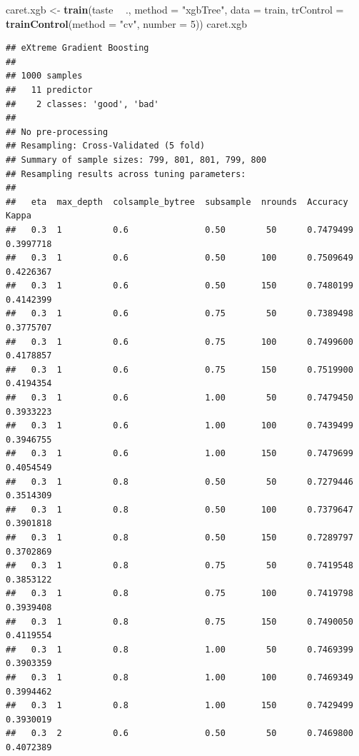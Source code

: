 \documentclass[
]{book}
\newenvironment{Shaded}{\begin{snugshade}}{\end{snugshade}}
\newcommand{\DataTypeTok}[1]{\textcolor[rgb]{0.13,0.29,0.53}{#1}}
\newcommand{\DecValTok}[1]{\textcolor[rgb]{0.00,0.00,0.81}{#1}}
\newcommand{\KeywordTok}[1]{\textcolor[rgb]{0.13,0.29,0.53}{\textbf{#1}}}
\newcommand{\NormalTok}[1]{#1}
\newcommand{\OperatorTok}[1]{\textcolor[rgb]{0.81,0.36,0.00}{\textbf{#1}}}
\newcommand{\StringTok}[1]{\textcolor[rgb]{0.31,0.60,0.02}{#1}}
\theoremstyle{break}
\theoremstyle{definition}
\theoremstyle{definition}
\theoremstyle{definition}
\theoremstyle{remark}
\begin{document}
\begin{Shaded}
\begin{Highlighting}[]
\NormalTok{caret.xgb <-}\StringTok{ }\KeywordTok{train}\NormalTok{(taste }\OperatorTok{~}\StringTok{ }\NormalTok{., }\DataTypeTok{method =} \StringTok{"xgbTree"}\NormalTok{, }\DataTypeTok{data =}\NormalTok{ train,}
                   \DataTypeTok{trControl =} \KeywordTok{trainControl}\NormalTok{(}\DataTypeTok{method =} \StringTok{"cv"}\NormalTok{, }\DataTypeTok{number =} \DecValTok{5}\NormalTok{))}
\NormalTok{caret.xgb}
\end{Highlighting}
\end{Shaded}

\begin{verbatim}
## eXtreme Gradient Boosting 
## 
## 1000 samples
##   11 predictor
##    2 classes: 'good', 'bad' 
## 
## No pre-processing
## Resampling: Cross-Validated (5 fold) 
## Summary of sample sizes: 799, 801, 801, 799, 800 
## Resampling results across tuning parameters:
## 
##   eta  max_depth  colsample_bytree  subsample  nrounds  Accuracy   Kappa    
##   0.3  1          0.6               0.50        50      0.7479499  0.3997718
##   0.3  1          0.6               0.50       100      0.7509649  0.4226367
##   0.3  1          0.6               0.50       150      0.7480199  0.4142399
##   0.3  1          0.6               0.75        50      0.7389498  0.3775707
##   0.3  1          0.6               0.75       100      0.7499600  0.4178857
##   0.3  1          0.6               0.75       150      0.7519900  0.4194354
##   0.3  1          0.6               1.00        50      0.7479450  0.3933223
##   0.3  1          0.6               1.00       100      0.7439499  0.3946755
##   0.3  1          0.6               1.00       150      0.7479699  0.4054549
##   0.3  1          0.8               0.50        50      0.7279446  0.3514309
##   0.3  1          0.8               0.50       100      0.7379647  0.3901818
##   0.3  1          0.8               0.50       150      0.7289797  0.3702869
##   0.3  1          0.8               0.75        50      0.7419548  0.3853122
##   0.3  1          0.8               0.75       100      0.7419798  0.3939408
##   0.3  1          0.8               0.75       150      0.7490050  0.4119554
##   0.3  1          0.8               1.00        50      0.7469399  0.3903359
##   0.3  1          0.8               1.00       100      0.7469349  0.3994462
##   0.3  1          0.8               1.00       150      0.7429499  0.3930019
##   0.3  2          0.6               0.50        50      0.7469800  0.4072389

\end{verbatim}
\end{document}
